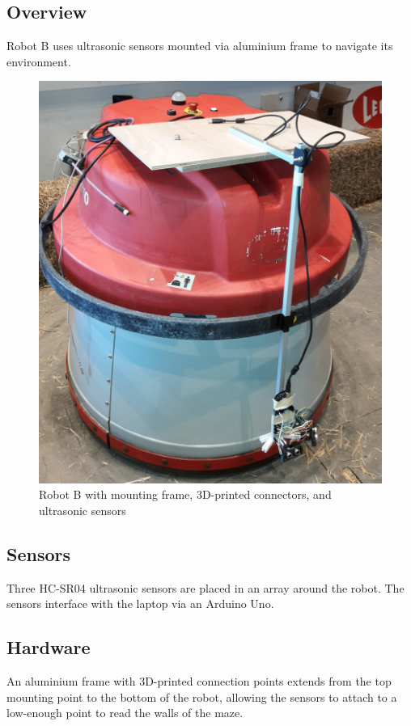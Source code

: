 \documentclass[11pt]{article}
\begin{document}
	\subsection{Overview}
	Robot B uses ultrasonic sensors mounted via aluminium frame to navigate its environment.
	
	\begin{figure}[h]
		\centering
		\includegraphics[scale=0.1]{robot_b_full}
		\caption{Robot B with mounting frame, 3D-printed connectors, and ultrasonic sensors}
	\end{figure}
	
	\subsection{Sensors}
	Three HC-SR04 ultrasonic sensors are placed in an array around the robot. The sensors interface with the laptop via an Arduino Uno.
	
	\subsection{Hardware}
	An aluminium frame with 3D-printed connection points extends from the top mounting point to the bottom of the robot, allowing the sensors to attach to a low-enough point to read the walls of the maze.
	
\end{document}
